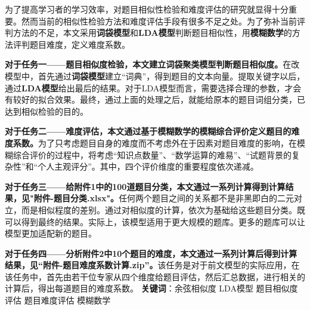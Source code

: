 为了提高学习者的学习效率，对题目相似性检验和难度评估的研究就显得十分重要。然而当前的相似性检验方法和难度评估手段有很多不足之处。为了弥补当前评判方法的不足，本文采用\textbf{词袋模型}和\textbf{LDA模型}判断题目相似性，用\textbf{模糊数学}的方法评判题目难度，定义难度系数。

\textbf{对于任务一——题目相似度检验，本文建立词袋聚类模型判断题目相似度。}在改模型中，首先通过\textbf{词袋模型}建立“词典”，得到题目的文本向量。提取关键字以后，通过\textbf{LDA模型}给出最后的结果。对于LDA模型而言，需要选择合理的参数，才会有较好的拟合效果。最终，通过上面的处理之后，就能给原本的题目词组分类，已达到相似检验的目的。

\textbf{对于任务二——难度评估，本文通过基于模糊数学的模糊综合评价定义题目的难度系数。}为了只考虑题目自身的难度而不考虑外在于因素对题目难度的影响，在模糊综合评价的过程中，将考虑“知识点数量”、“数学运算的难易”、“试题背景的复杂性”和“个人主观评分”。其中，四个评价维度的重要程度依次递减。

\textbf{对于任务三——给附件1中的100道题目分类，本文通过一系列计算得到计算结果，见"附件-题目分类.xlsx"。}任何两个题目之间的关系都不是非黑即白的二元对立，而是相似程度的差别。通过对相似度的计算，依次为基础给这些题目分类。既可以得到最终的结果。实际上，该模型适用于更大规模的题库。更多的题库可以让模型更加适配新的题目。

\textbf{对于任务四——分析附件2中10个题目的难度，本文通过一系列计算后得到计算结果，见“附件-题目难度系数计算.zip”。}该任务是对于前文模型的实际应用，在该任务中，首先由若干位专家从四个维度给题目评估，然后汇总数据，进行相关的计算后，得出每道题目的难度系数。
\newline
\newline
\textbf{关键词}：余弦相似度 \quad LDA模型 \quad 题目相似度评估 \quad 题目难度评估 \quad 模糊数学

\newpage
\thispagestyle{empty}
\tableofcontents